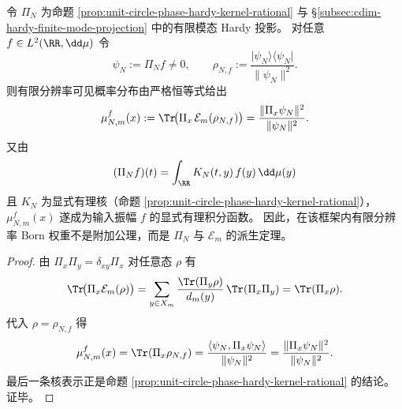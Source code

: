 \begin{proposition}\label{prop:conclusion-born-weight-derived-from-hardy-and-fold-expectation}
令 \(\Pi_N\) 为命题 \ref{prop:unit-circle-phase-hardy-kernel-rational} 与 \S\ref{subsec:cdim-hardy-finite-mode-projection} 中的有限模态 Hardy 投影。
对任意 \(f\in L^2(\RR,\dd\mu)\) 令
\[
\psi_N:=\Pi_N f\neq 0,
\qquad
\rho_{N,f}:=\frac{\lvert\psi_N\rangle\langle\psi_N\rvert}{\|\psi_N\|^2}.
\]
则有限分辨率可见概率分布由严格恒等式给出
\[
\mu_{N,m}^f(x)
:=
\Tr\!\bigl(\Pi_x\,\mathcal E_m(\rho_{N,f})\bigr)
=
\frac{\|\Pi_x\psi_N\|^2}{\|\psi_N\|^2}.
\]
又由
\[
(\Pi_N f)(t)=\int_{\RR}K_N(t,y)\,f(y)\,\dd\mu(y)
\]
且 \(K_N\) 为显式有理核（命题 \ref{prop:unit-circle-phase-hardy-kernel-rational}），\(\mu_{N,m}^f(x)\) 遂成为输入振幅 \(f\) 的显式有理积分函数。
因此，在该框架内有限分辨率 Born 权重不是附加公理，而是 \(\Pi_N\) 与 \(\mathcal E_m\) 的派生定理。
\end{proposition}
\begin{proof}
由 \(\Pi_x\Pi_y=\delta_{xy}\Pi_x\) 对任意态 \(\rho\) 有
\[
\Tr\!\bigl(\Pi_x\mathcal E_m(\rho)\bigr)
=
\sum_{y\in X_m}\frac{\Tr(\Pi_y\rho)}{d_m(y)}\,\Tr(\Pi_x\Pi_y)
=
\Tr(\Pi_x\rho).
\]
代入 \(\rho=\rho_{N,f}\) 得
\[
\mu_{N,m}^f(x)
=
\Tr(\Pi_x\rho_{N,f})
=
\frac{\langle \psi_N,\Pi_x\psi_N\rangle}{\|\psi_N\|^2}
=
\frac{\|\Pi_x\psi_N\|^2}{\|\psi_N\|^2}.
\]
最后一条核表示正是命题 \ref{prop:unit-circle-phase-hardy-kernel-rational} 的结论。证毕。
\end{proof}

